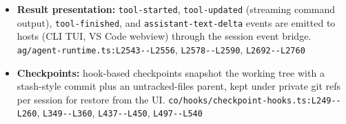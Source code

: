 \begin{itemize}
\item \textbf{Result presentation:} \texttt{tool-\allowbreak{}started}, \texttt{tool-\allowbreak{}updated} (streaming command output), \texttt{tool-\allowbreak{}finished}, and \texttt{assistant-\allowbreak{}text-\allowbreak{}delta} events are emitted to hosts (CLI TUI, VS Code webview) through the session event bridge. \texttt{ag/\allowbreak{}agent-\allowbreak{}runtime.\allowbreak{}ts:\allowbreak{}L2543-\allowbreak{}-\allowbreak{}L2556}, \texttt{L2578-\allowbreak{}-\allowbreak{}L2590}, \texttt{L2692-\allowbreak{}-\allowbreak{}L2760}
\item \textbf{Checkpoints:} hook-based checkpoints snapshot the working tree with a stash-style commit plus an untracked-files parent, kept under private git refs per session for restore from the UI. \texttt{co/\allowbreak{}hooks/\allowbreak{}checkpoint-\allowbreak{}hooks.\allowbreak{}ts:\allowbreak{}L249-\allowbreak{}-\allowbreak{}L260}, \texttt{L349-\allowbreak{}-\allowbreak{}L360}, \texttt{L437-\allowbreak{}-\allowbreak{}L450}, \texttt{L497-\allowbreak{}-\allowbreak{}L540}
\end{itemize}

